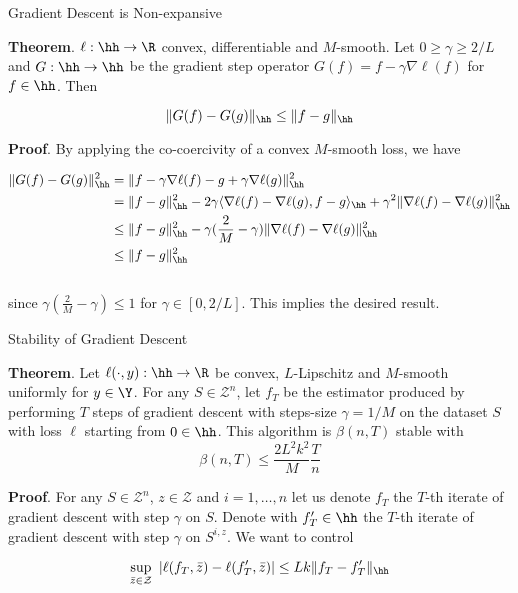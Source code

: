 \documentclass[10pt,mathserif]{beamer}
\begin{document}
\begin{frame}{Gradient Descent is Non-expansive}

{\bf Theorem}. $\ell:\hh\to\R$ convex, differentiable and $M$-smooth. Let $0\geq\gamma\geq 2/L$ and $G:\hh\to\hh$ be the gradient step operator $G(f) = f - \gamma \nabla \ell(f)$ for $f\in\hh$. Then 

$$
  \|G(f) - G(g)\|_\hh \leq \|f - g\|_\hh
$$

{\bf Proof}. By applying the co-coercivity of a convex $M$-smooth loss, we have

{
\footnotesize
\begin{align*}
  \|G(f) - G(g)\|_\hh^2 & = \|f - \gamma \nabla \ell(f) - g + \gamma \nabla \ell(g)\|_\hh^2\\ 
                        & = \|f - g\|_\hh^2 - 2\gamma\langle\nabla\ell(f)-\nabla\ell(g),f-g\rangle_\hh + \gamma^2\|\nabla\ell(f)-\nabla\ell(g)\|_\hh^2 \\
                        & \leq \|f - g\|_\hh^2 - \gamma(\frac{2}{M} - \gamma)\|\nabla\ell(f)-\nabla\ell(g)\|_\hh^2 \\
                        & \leq \|f - g\|_\hh^2
\end{align*}
}
\ \\
since $\gamma(\frac{2}{M}-\gamma)\leq1$ for $\gamma \in[0,2/L]$. This implies the desired result. 


\end{frame}



\begin{frame}{Stability of Gradient Descent}

{\bf Theorem}. Let $\ell(\cdot,y):\hh\to\R$ be convex, $L$-Lipschitz and $M$-smooth uniformly for $y\in\Y$. For any $S\in\mathcal Z^n$, let $f_T$ be the estimator produced by performing $T$ steps of gradient descent with steps-size $\gamma = 1/M$ on the dataset $S$ with loss $\ell$ starting from $0\in\hh$. This algorithm is $\beta(n,T)$ stable with 
$$
\beta(n,T) \leq \frac{2L^2k^2}{M} \frac{T}{n}
$$ 

{\bf Proof}. For any $S\in\mathcal Z^n$, $z\in\mathcal Z$ and $i=1,\dots,n$ let us denote $f_T$ the $T$-th iterate of gradient descent with step $\gamma$ on $S$. Denote with $f_T'\in\hh$ the $T$-th iterate of gradient descent with step $\gamma$ on $S^{i,z}$. We want to control

$$
\sup_{\bar z\in\mathcal Z} ~ |\ell(f_T,\bar z) - \ell(f_T',\bar z)| \leq Lk\|f_T - f_T'\|_\hh
$$ 


\end{frame}
\end{document}

